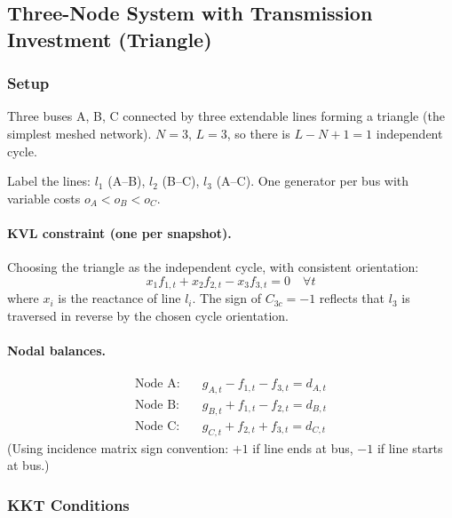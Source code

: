 \documentclass{article}
\begin{document}
\subsection{Three-Node System with Transmission Investment (Triangle)}
\label{sec:triangle}

\subsubsection{Setup}

Three buses A, B, C connected by three extendable lines forming a triangle
(the simplest meshed network). $N = 3$, $L = 3$, so there is
$L - N + 1 = 1$ independent cycle.

Label the lines: $l_1$ (A--B), $l_2$ (B--C), $l_3$ (A--C).
One generator per bus with variable costs $o_A < o_B < o_C$.

\paragraph{KVL constraint (one per snapshot).}
Choosing the triangle as the independent cycle, with consistent orientation:
\begin{equation}
    x_1 f_{1,t} + x_2 f_{2,t} - x_3 f_{3,t} = 0
    \quad \forall t
    \label{eq:triangle_kvl}
\end{equation}
where $x_i$ is the reactance of line $l_i$.
The sign of $C_{3c} = -1$ reflects that $l_3$ is traversed in reverse by
the chosen cycle orientation.

\paragraph{Nodal balances.}
\begin{align}
    \text{Node A:} & \quad g_{A,t} - f_{1,t} - f_{3,t} = d_{A,t} \\
    \text{Node B:} & \quad g_{B,t} + f_{1,t} - f_{2,t} = d_{B,t} \\
    \text{Node C:} & \quad g_{C,t} + f_{2,t} + f_{3,t} = d_{C,t}
\end{align}
(Using incidence matrix sign convention: $+1$ if line ends at bus, $-1$ if line starts at bus.)

\subsubsection{KKT Conditions}
\end{document}
